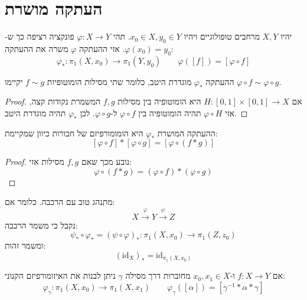 \documentclass{tstextbook}
\begin{document}
\section{העתקה מושרת}

\begin{definition}
יהיו \(X,Y\) מרחבים טופולוגיים ויהיו \(x_{0} \in X,y_{0} \in Y\). תהי \(\varphi:X\to Y\) פונקציה רציפה כך ש-\(\varphi(x_{0})=y_{0}\). אזי ההעתקה \(\varphi\) משרה את ההעתקה:
$$\varphi_{*}:\pi_{1}(X,x_{0})\to\pi_{1}(Y,y_{0})\qquad \varphi([f])=\left[ \varphi \circ  f \right]$$

\end{definition}
\begin{proposition}
ההעתקה \(\varphi_{*}\) מוגדרת היטב, כלומר שתי מסילות הומוטופיות \(f\sim g\) יקיימו \(\varphi \circ f \sim \varphi \circ g\).

\end{proposition}
\begin{proof}
אם \(H:[0,1]\times[0,1]\to X\) היא הומוטופיה בין מסילות \(f,g\) המשמרת נקודות קצה, אזי \(\varphi \circ H\) תהיה הומוטופיה בין \(\varphi \circ f\) ל-\(\varphi \circ g\). לכן \(\varphi_{*}\) תהיה מוגדרת היטב.

\end{proof}
\begin{proposition}
ההעתקה המושרת \(\varphi_{*}\) היא הומומורפיזם של חבורות כיוון שמקיימת:
$$\left[ \varphi \circ f \right]*\left[ \varphi \circ g \right]=\left[ \varphi \circ (f*g) \right]$$

\end{proposition}
\begin{proof}
נובע מכך שאם \(f,g\) מסילות אזי:
$$\varphi \circ (f*g)=\left( \varphi \circ f \right)*\left( \varphi \circ g \right)$$

\end{proof}
\begin{proposition}
מתנהג טוב עם הרכבה. כלומר אם:
$$X\xrightarrow{\varphi}Y\xrightarrow{\psi}Z$$
נקבל כי משמר הרכבה:
$$\psi_{*}\circ \varphi_{*}=\left( \psi\circ \varphi \right)_{*}:\pi_{1}(X,x_{0})\to\pi_{1}(Z,z_{0})$$
ומשמר זהות:
$$({\mathrm{id}}_{X})_{*}={\mathrm{id}}_{\pi_{1}(X,x_{0})}$$

\end{proposition}
\begin{proposition}
אם \(f:X\to Y\) ו-\(x_{0},x_{1} \in X\) מחוברות דרך מסילה \(\gamma\) ניתן לבנות את האיזומורפיזם הקנוני:
$$\varphi_{\gamma}:\pi_{1}(X,x_{0})\rightarrow\pi_{1}(X,x_{1})\qquad \varphi_{\gamma}([\alpha])=[\gamma^{-1}*\alpha*\gamma]$$

\end{proposition}
\end{document}
